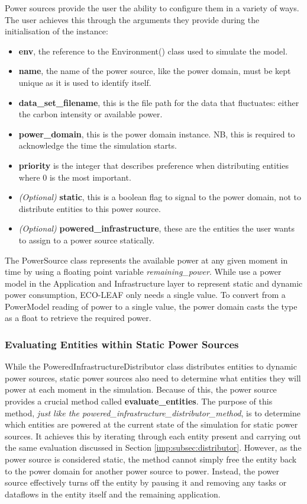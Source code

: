 \documentclass{l4proj}
\begin{document}
Power sources provide the user the ability to configure them in a variety of ways.
The user achieves this through the arguments they provide during the initialisation of the instance:
\begin{itemize}
    \item \textbf{env}, the reference to the Environment() class used to simulate the model.
    \item \textbf{name}, the name of the power source, like the power domain, must be kept unique as it is used to identify itself.
    \item \textbf{data\_set\_filename}, this is the file path for the data that fluctuates: either the carbon intensity or available power.
    \item \textbf{power\_domain}, this is the power domain instance. NB, this is required to acknowledge the time the simulation starts.
    \item \textbf{priority} is the integer that describes preference when distributing entities where 0 is the most important.
    \item \textit{(Optional)} \textbf{static}, this is a boolean flag to signal to the power domain, not to distribute entities to this power source.
    \item \textit{(Optional)} \textbf{powered\_infrastructure}, these are the entities the user wants to assign to a power source statically.
\end{itemize}
The PowerSource class represents the available power at any given moment in time by using a floating point variable \textit{remaining\_power}.
While \cite{leaf2021} use a power model in the Application and Infrastructure layer to represent static and dynamic power consumption, ECO-LEAF only needs a single value.
To convert from a PowerModel reading of power to a single value, the power domain casts the type as a float to retrieve the required power.

\subsubsection{Evaluating Entities within Static Power Sources}\label{imp:subsec:static-entities}
While the PoweredInfrastructureDistributor class distributes entities to dynamic power sources, static power sources also need to determine what entities they will power at each moment in the simulation.
Because of this, the power source provides a crucial method called \textbf{evaluate\_entities}.
The purpose of this method, \textit{just like the powered\_infrastructure\_distributor\_method}, is to determine which entities are powered at the current state of the simulation for static power sources.
It achieves this by iterating through each entity present and carrying out the same evaluation discussed in Section \ref{imp:subsec:distributor}.
However, as the power source is considered static, the method cannot simply free the entity back to the power domain for another power source to power.
Instead, the power source effectively turns off the entity by pausing it and removing any tasks or dataflows in the entity itself and the remaining application.
\end{document}
